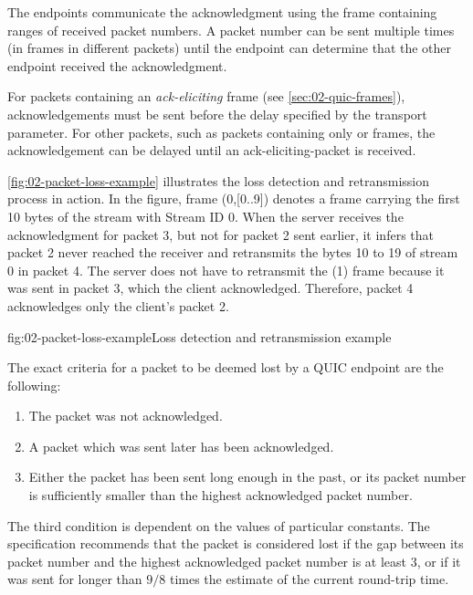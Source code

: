 The endpoints communicate the acknowledgment using the \ACK{} frame containing ranges of received
packet numbers. A packet number can be sent multiple times (in \ACK{} frames in different packets)
until the endpoint can determine that the other endpoint received the acknowledgment.

For packets containing an \textit{ack-eliciting} frame (see \autoref{sec:02-quic-frames}),
acknowledgements must be sent before the delay specified by the \MaxAckDelay{} transport parameter.
For other packets, such as packets containing only \ACK{} or \PADDING{} frames, the acknowledgement
can be delayed until an \gls{ack-eliciting-packet} is received.

\autoref{fig:02-packet-loss-example} illustrates the loss detection and retransmission process in
action. In the figure, frame \STREAM{}(0,[0..9]) denotes a \STREAM{} frame carrying the first 10
bytes of the stream with Stream ID 0. When the server receives the acknowledgment for packet 3, but
not for packet 2 sent earlier, it infers that packet 2 never reached the receiver and retransmits
the bytes 10 to 19 of stream 0 in packet 4. The server does not have to retransmit the \ACK{}(1)
frame because it was sent in packet 3, which the client acknowledged. Therefore, packet 4
acknowledges only the client's packet 2.

\begin{myFigure}{fig:02-packet-loss-example}{Loss detection and retransmission example}

\resizebox{\linewidth}{!}{}

\end{myFigure}

The exact criteria for a packet to be deemed lost by a QUIC endpoint are the following:

\begin{enumerate}

  \item The packet was not acknowledged.

  \item A packet which was sent later has been acknowledged.

  \item Either the packet has been sent long enough in the past, or its packet number is
sufficiently smaller than the highest acknowledged packet number.

\end{enumerate}

The third condition is dependent on the values of particular constants. The specification recommends
that the packet is considered lost if the gap between its packet number and the highest acknowledged
packet number is at least 3, or if it was sent for longer than $9/8$ times the estimate of the
current round-trip time.

